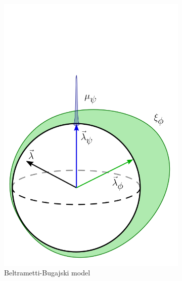 \documentclass[%
 reprint, onecolumn, 12pt,
superscriptaddress,
nofootinbib,
 prx, 
]{quantumarticle}
\begin{document}
\begin{figure}[t]
\begin{subfigure}[t]{0.24\textwidth}
 \includegraphics[width=\textwidth]{BB_model_v3.png}
 \caption{Beltrametti-Bugajski model}
 \label{fig:BBmodel}
 \end{subfigure}
 \begin{subfigure}[t]{0.24\textwidth}

\end{subfigure}
\end{figure}
\end{document}
